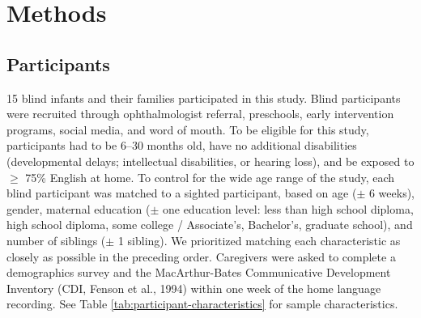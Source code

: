 \documentclass[
  man,floatsintext]{apa6}
\begin{document}
\hypertarget{methods}{%
\section{Methods}\label{methods}}

\hypertarget{participants}{%
\subsection{Participants}\label{participants}}

15 blind infants and their families participated in this study. Blind participants were recruited through ophthalmologist referral, preschools, early intervention programs, social media, and word of mouth. To be eligible for this study, participants had to be 6--30 months old, have no additional disabilities (developmental delays; intellectual disabilities, or hearing loss), and be exposed to \(\geq\) 75\% English at home. To control for the wide age range of the study, each blind participant was matched to a sighted participant, based on age (\(\pm\) 6 weeks), gender, maternal education (\(\pm\) one education level: less than high school diploma, high school diploma, some college / Associate's, Bachelor's, graduate school), and number of siblings (\(\pm\) 1 sibling). We prioritized matching each characteristic as closely as possible in the preceding order. Caregivers were asked to complete a demographics survey and the MacArthur-Bates Communicative Development Inventory (CDI, Fenson et al., 1994) within one week of the home language recording. See Table \ref{tab:participant-characteristics} for sample characteristics.
\end{document}
